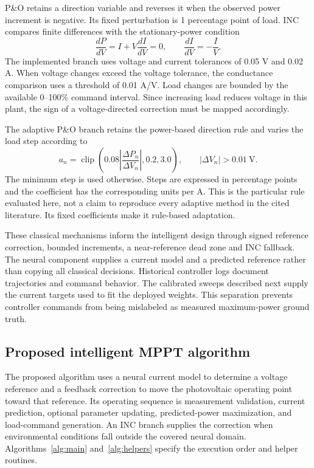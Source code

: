 \documentclass[Acad.Energy.,researcharticle,9pt,twoside,oneauthor]{Definitions/jams_academia}
\begin{document}
P\&O retains a direction variable and reverses it when the observed power increment is negative. Its fixed perturbation is 1 percentage point of load. INC compares finite differences with the stationary-power condition
\begin{equation}
 \frac{dP}{dV}=I+V\frac{dI}{dV}=0,
 \qquad \frac{dI}{dV}=-\frac{I}{V}.
\end{equation}
The implemented branch uses voltage and current tolerances of 0.05 V and 0.02 A. When voltage changes exceed the voltage tolerance, the conductance comparison uses a threshold of 0.01 A/V. Load changes are bounded by the available 0--100\% command interval. Since increasing load reduces voltage in this plant, the sign of a voltage-directed correction must be mapped accordingly.

The adaptive P\&O branch retains the power-based direction rule and varies the load step according to
\begin{equation}
 a_n=\operatorname{clip}\left(0.08\left|\frac{\Delta P_n}{\Delta V_n}\right|,0.2,3.0\right),
 \qquad |\Delta V_n|>0.01\ \mathrm{V}.
\end{equation}
The minimum step is used otherwise. Steps are expressed in percentage points and the coefficient has the corresponding units per A. This is the particular rule evaluated here, not a claim to reproduce every adaptive method in the cited literature. Its fixed coefficients make it rule-based adaptation.

These classical mechanisms inform the intelligent design through signed reference correction, bounded increments, a near-reference dead zone and INC fallback. The neural component supplies a current model and a predicted reference rather than copying all classical decisions. Historical controller logs document trajectories and command behavior. The calibrated sweeps described next supply the current targets used to fit the deployed weights. This separation prevents controller commands from being mislabeled as measured maximum-power ground truth.

\subsection{Proposed intelligent MPPT algorithm}
\label{sec:intelligent}
The proposed algorithm uses a neural current model to determine a voltage reference and a feedback correction to move the photovoltaic operating point toward that reference. Its operating sequence is measurement validation, current prediction, optional parameter updating, predicted-power maximization, and load-command generation. An INC branch supplies the correction when environmental conditions fall outside the covered neural domain. Algorithms~\ref{alg:main} and~\ref{alg:helpers} specify the execution order and helper routines.
\end{document}
